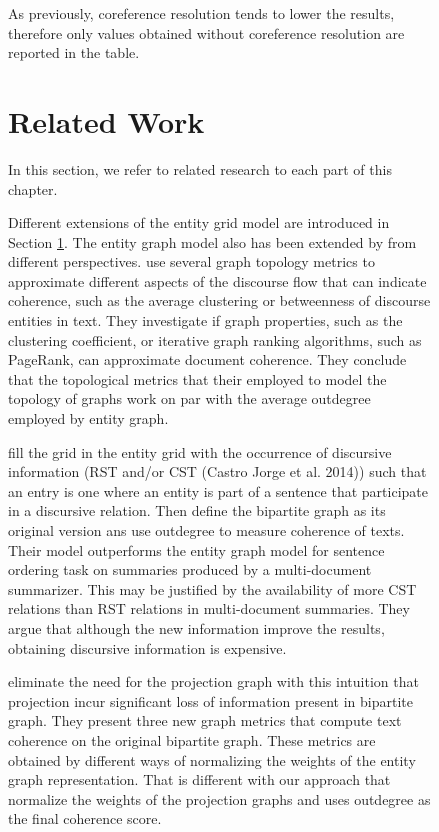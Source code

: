 \begin{figure}[!t]
As previously, coreference resolution tends to lower the results, therefore only values obtained without coreference resolution are reported in the table.

\section{Related Work}
%
In this section, we refer to related research to each part of this chapter. 

Different extensions of the entity grid model are introduced in Section \ref{}. 
The entity graph model also has been extended by from different perspectives. 
\cite{petersen15} use several graph topology metrics to approximate different aspects of the discourse flow that can indicate coherence, such as the average clustering or betweenness of discourse entities in text. 
They investigate if graph properties, such as the clustering coefficient, or iterative graph ranking algorithms, such as PageRank,  can approximate document coherence. 
They conclude that the topological metrics that their employed to model the topology of graphs work on par with the average outdegree employed by  entity graph. 

\cite{dias15}  fill the grid in the entity grid with the occurrence of discursive information
(RST and/or CST \cite{?}(Castro Jorge et al. 2014)) such that an entry is one where an entity is part of a sentence that participate in a discursive relation.
Then define the bipartite graph as its original version ans use outdegree to measure coherence of texts. 
Their model outperforms the entity graph model for sentence ordering task on summaries produced by a multi-document summarizer. 
This may be justified by the availability of more CST relations than RST relations in multi-document summaries.
They argue that although the new information improve the results, obtaining discursive information is expensive. 

\cite{lioma16} eliminate the need for the projection graph with this intuition that projection incur significant loss of information present in bipartite graph.  
They present three new graph metrics that compute text coherence on the original bipartite graph. 
These metrics are obtained by different ways of normalizing the weights of the entity graph representation. 
That is different with our approach that normalize the weights of the projection graphs and uses outdegree as the final coherence score. 

 

\end{figure}
